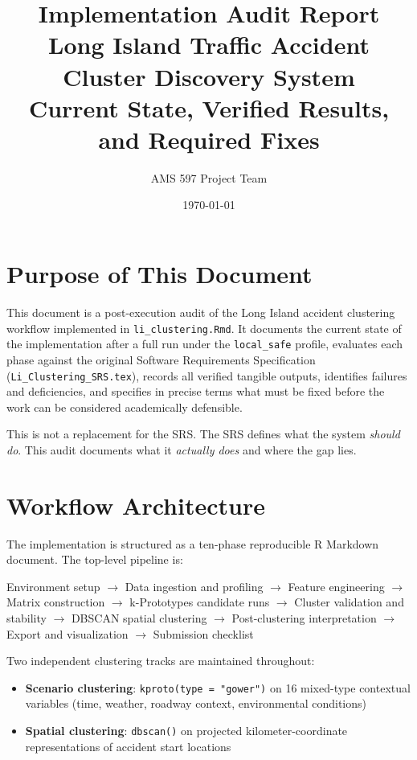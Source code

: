 \documentclass[11pt]{article}
\title{Implementation Audit Report\\Long Island Traffic Accident Cluster Discovery System\\
\large Current State, Verified Results, and Required Fixes}
\author{AMS 597 Project Team}
\date{\today}
\begin{document}
\maketitle
\tableofcontents
\newpage

\section{Purpose of This Document}

This document is a post-execution audit of the Long Island accident clustering workflow
implemented in \texttt{li\_clustering.Rmd}. It documents the current state of the
implementation after a full run under the \texttt{local\_safe} profile, evaluates each
phase against the original Software Requirements Specification
(\texttt{Li\_Clustering\_SRS.tex}), records all verified tangible outputs, identifies
failures and deficiencies, and specifies in precise terms what must be fixed before
the work can be considered academically defensible.

This is not a replacement for the SRS. The SRS defines what the system \textit{should do}.
This audit documents what it \textit{actually does} and where the gap lies.

\section{Workflow Architecture}

The implementation is structured as a ten-phase reproducible R Markdown document. The
top-level pipeline is:

\begin{center}
Environment setup
$\rightarrow$ Data ingestion and profiling
$\rightarrow$ Feature engineering
$\rightarrow$ Matrix construction
$\rightarrow$ k-Prototypes candidate runs
$\rightarrow$ Cluster validation and stability
$\rightarrow$ DBSCAN spatial clustering
$\rightarrow$ Post-clustering interpretation
$\rightarrow$ Export and visualization
$\rightarrow$ Submission checklist
\end{center}

Two independent clustering tracks are maintained throughout:

\begin{itemize}
\item \textbf{Scenario clustering}: \texttt{kproto(type = "gower")} on 16 mixed-type
  contextual variables (time, weather, roadway context, environmental conditions)
\item \textbf{Spatial clustering}: \texttt{dbscan()} on projected kilometer-coordinate
  representations of accident start locations
\end{itemize}
\end{document}

